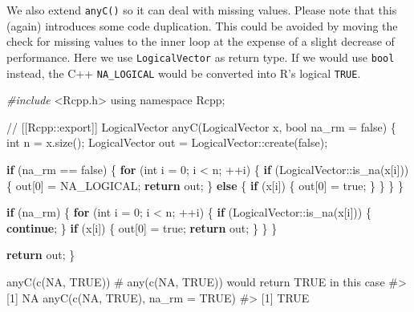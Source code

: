 \documentclass[
]{krantz}
\makeatletter
\newenvironment{Shaded}{\begin{snugshade}}{\end{snugshade}}
\newcommand{\CommentTok}[1]{\textcolor[rgb]{0.56,0.35,0.01}{\textit{#1}}}
\newcommand{\ControlFlowTok}[1]{\textcolor[rgb]{0.13,0.29,0.53}{\textbf{#1}}}
\newcommand{\DataTypeTok}[1]{\textcolor[rgb]{0.13,0.29,0.53}{#1}}
\newcommand{\DecValTok}[1]{\textcolor[rgb]{0.00,0.00,0.81}{#1}}
\newcommand{\ImportTok}[1]{#1}
\newcommand{\KeywordTok}[1]{\textcolor[rgb]{0.13,0.29,0.53}{\textbf{#1}}}
\newcommand{\NormalTok}[1]{#1}
\newcommand{\OtherTok}[1]{\textcolor[rgb]{0.56,0.35,0.01}{#1}}
\newcommand{\PreprocessorTok}[1]{\textcolor[rgb]{0.56,0.35,0.01}{\textit{#1}}}
\newenvironment{kframe}{%
\medskip{}
\setlength{\fboxsep}{.8em}
 \def\at@end@of@kframe{}%
 \ifinner\ifhmode%
  \def\at@end@of@kframe{\end{minipage}}%
  \begin{minipage}{\columnwidth}%
 \fi\fi%
 \def\FrameCommand##1{\hskip\@totalleftmargin \hskip-\fboxsep
 \colorbox{shadecolor}{##1}\hskip-\fboxsep
     \hskip-\linewidth \hskip-\@totalleftmargin \hskip\columnwidth}%
 \MakeFramed {\advance\hsize-\width
   \@totalleftmargin\z@ \linewidth\hsize
   \@setminipage}}%
 {\par\unskip\endMakeFramed%
 \at@end@of@kframe}
\renewenvironment{Shaded}{\begin{kframe}}{\end{kframe}}
\renewcommand{\KeywordTok} [1]{\textcolor[rgb]{0.00,0.44,0.13}{{#1}}}
\renewcommand{\DataTypeTok}[1]{\textcolor[rgb]{0.56,0.13,0.00}{{#1}}}
\renewcommand{\DecValTok}  [1]{\textcolor[rgb]{0.25,0.63,0.44}{{#1}}}
\renewcommand{\CommentTok} [1]{\textcolor[rgb]{0.38,0.63,0.69}{{#1}}}
\renewcommand{\OtherTok}   [1]{\textcolor[rgb]{0.00,0.44,0.13}{{#1}}}
\renewcommand{\NormalTok}  [1]{{#1}}
\makeatother
\begin{document}
We also extend \texttt{anyC()} so it can deal with missing values. Please note that this (again) introduces some code duplication. This could be avoided by moving the check for missing values to the inner loop at the expense of a slight decrease of performance. Here we use \texttt{LogicalVector} as return type. If we would use \texttt{bool} instead, the C++ \texttt{NA\_LOGICAL} would be converted into R's logical \texttt{TRUE}.

\begin{Shaded}
\begin{Highlighting}[]
\PreprocessorTok{#include }\ImportTok{<Rcpp.h>}
\KeywordTok{using} \KeywordTok{namespace}\NormalTok{ Rcpp;}

\CommentTok{// [[Rcpp::export]]}
\NormalTok{LogicalVector anyC(LogicalVector x, }\DataTypeTok{bool}\NormalTok{ na_rm = }\KeywordTok{false}\NormalTok{) \{}
  \DataTypeTok{int}\NormalTok{ n = x.size();}
\NormalTok{  LogicalVector out = LogicalVector::create(}\KeywordTok{false}\NormalTok{);}

  \ControlFlowTok{if}\NormalTok{ (na_rm == }\KeywordTok{false}\NormalTok{) \{}
    \ControlFlowTok{for}\NormalTok{ (}\DataTypeTok{int}\NormalTok{ i = }\DecValTok{0}\NormalTok{; i < n; ++i) \{}
      \ControlFlowTok{if}\NormalTok{ (LogicalVector::is_na(x[i])) \{}
\NormalTok{        out[}\DecValTok{0}\NormalTok{] = NA_LOGICAL;}
        \ControlFlowTok{return}\NormalTok{ out;}
\NormalTok{      \} }\ControlFlowTok{else}\NormalTok{ \{}
        \ControlFlowTok{if}\NormalTok{ (x[i]) \{}
\NormalTok{          out[}\DecValTok{0}\NormalTok{] = }\KeywordTok{true}\NormalTok{;}
\NormalTok{        \}}
\NormalTok{      \}}
\NormalTok{    \}}
\NormalTok{  \}}

  \ControlFlowTok{if}\NormalTok{ (na_rm) \{}
    \ControlFlowTok{for}\NormalTok{ (}\DataTypeTok{int}\NormalTok{ i = }\DecValTok{0}\NormalTok{; i < n; ++i) \{}
      \ControlFlowTok{if}\NormalTok{ (LogicalVector::is_na(x[i])) \{}
        \ControlFlowTok{continue}\NormalTok{;}
\NormalTok{      \}}
      \ControlFlowTok{if}\NormalTok{ (x[i]) \{}
\NormalTok{        out[}\DecValTok{0}\NormalTok{] = }\KeywordTok{true}\NormalTok{;}
        \ControlFlowTok{return}\NormalTok{ out;}
\NormalTok{      \}}
\NormalTok{    \}}
\NormalTok{  \}}
  
  \ControlFlowTok{return}\NormalTok{ out;}
\NormalTok{\}}
\end{Highlighting}
\end{Shaded}

\begin{Shaded}
\begin{Highlighting}[]
\KeywordTok{anyC}\NormalTok{(}\KeywordTok{c}\NormalTok{(}\OtherTok{NA}\NormalTok{, }\OtherTok{TRUE}\NormalTok{))  }\CommentTok{# any(c(NA, TRUE)) would return TRUE in this case}
\CommentTok{#> [1] NA}
\KeywordTok{anyC}\NormalTok{(}\KeywordTok{c}\NormalTok{(}\OtherTok{NA}\NormalTok{, }\OtherTok{TRUE}\NormalTok{), }\DataTypeTok{na_rm =} \OtherTok{TRUE}\NormalTok{)}
\CommentTok{#> [1] TRUE}
\end{Highlighting}
\end{Shaded}
\end{document}
